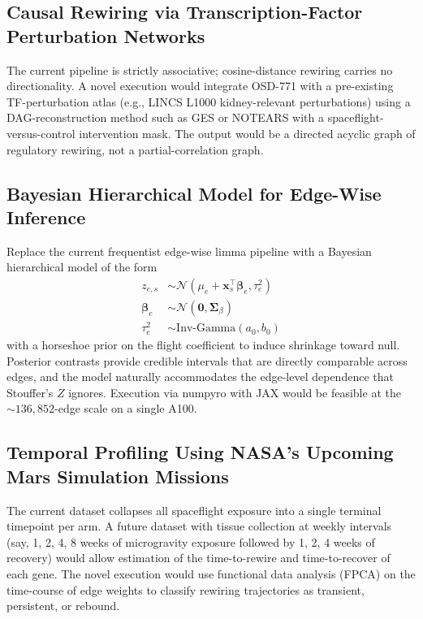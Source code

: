 \documentclass[11pt]{article}
\newcommand{\pkg}[1]{\textsf{#1}}
\begin{document}
\subsection{Causal Rewiring via Transcription-Factor Perturbation Networks}
The current pipeline is strictly associative; cosine-distance rewiring carries no directionality. A novel execution would integrate OSD-771 with a pre-existing TF-perturbation atlas (e.g., LINCS L1000 kidney-relevant perturbations) using a DAG-reconstruction method such as GES or NOTEARS with a spaceflight-versus-control intervention mask. The output would be a directed acyclic graph of regulatory rewiring, not a partial-correlation graph.

\subsection{Bayesian Hierarchical Model for Edge-Wise Inference}
Replace the current frequentist edge-wise limma pipeline with a Bayesian hierarchical model of the form
\begin{align}
z_{e,s} &\sim \mathcal{N}(\mu_e + \bm{x}_s^\top \bm{\beta}_e, \tau_e^2) \\
\bm{\beta}_e &\sim \mathcal{N}(\bm{0}, \bm{\Sigma}_{\beta}) \\
\tau_e^2 &\sim \text{Inv-Gamma}(a_0, b_0)
\end{align}
with a horseshoe prior on the flight coefficient to induce shrinkage toward null. Posterior contrasts provide credible intervals that are directly comparable across edges, and the model naturally accommodates the edge-level dependence that Stouffer's $Z$ ignores. Execution via \pkg{numpyro} with JAX would be feasible at the $\sim 136{,}852$-edge scale on a single A100.

\subsection{Temporal Profiling Using NASA's Upcoming Mars Simulation Missions}
The current dataset collapses all spaceflight exposure into a single terminal timepoint per arm. A future dataset with tissue collection at weekly intervals (say, 1, 2, 4, 8 weeks of microgravity exposure followed by 1, 2, 4 weeks of recovery) would allow estimation of the time-to-rewire and time-to-recover of each gene. The novel execution would use functional data analysis (FPCA) on the time-course of edge weights to classify rewiring trajectories as transient, persistent, or rebound.
\end{document}
